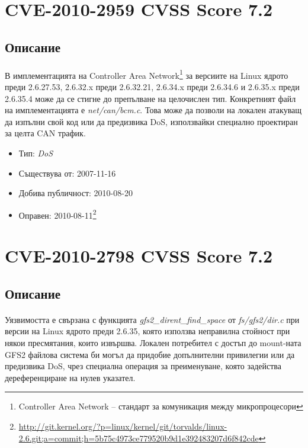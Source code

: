 \documentclass[a4paper,12pt,leqno]{article}
\begin{document}
\section{CVE-2010-2959 CVSS Score 7.2}
\subsection{Описание}
\paragraph{}
В имплементацията на Controller Area Network\footnote{Controller Area Network – стандарт за комуникация между микропроцесори}
 за версиите на Linux ядрото 
преди 2.6.27.53, 2.6.32.x преди 2.6.32.21, 2.6.34.x преди 2.6.34.6 и 2.6.35.x 
преди 2.6.35.4 може да се стигне до препълване на целочислен тип. 
Конкретният файл на имплементацията е \textit{net/can/bcm.c}. Това може да позволи 
на локален атакуващ да изпълни свой код или да предизвика DoS, 
използвайки специално проектиран за целта CAN трафик.


\begin{itemize}
    \item Тип: \textit{DoS}
    \item Съществува от: 2007-11-16
  	\item Добива публичност: 2010-08-20
    \item Оправен: 2010-08-11\footnote{\url{http://git.kernel.org/?p=linux/kernel/git/torvalds/linux-2.6.git;a=commit;h=5b75c4973ce779520b9d1e392483207d6f842cde}}
\end{itemize}

\section{CVE-2010-2798 CVSS Score 7.2}
\subsection{Описание}
\paragraph{}
Уязвимостта е свързана с функцията \textit{gfs2\_dirent\_find\_space} от \textit{fs/gfs2/dir.c} при 
версии на Linux ядрото преди 2.6.35, която използва неправилна стойност при 
някои пресмятания, които извършва. Локален потребител с достъп до mount-ната GFS2 файлова система би могъл да придобие допълнителни привилегии 
или да предизвика DoS, чрез специална операция за преименуване, която 
задейства дереференциране на нулев указател.
\end{document}
